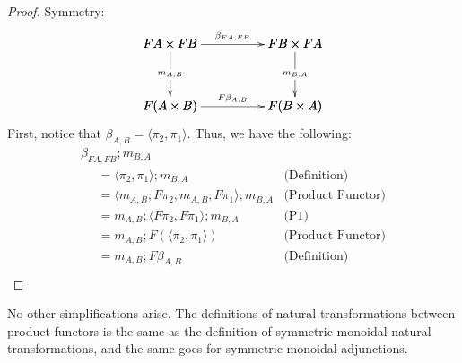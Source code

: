 \documentclass{article}
\begin{document}
\begin{proof}
\item[] Symmetry:\\
  \[
  \bfig
  \square|amma|/->`->`->`->/<1000,500>[
    FA \times FB`
    FB \times FA`
    F(A \times B)`
    F(B \times A);
    {\beta}_{FA,FB}`
    m_{A,B}`
    m_{B,A}`
    F{\beta}_{A,B}]
  \efig
  \]
  First, notice that $\beta_{A,B} = \langle \pi_2, \pi_1 \rangle$.  Thus, we have the following:
  \[
  \begin{array}{lll}
    \beta_{FA,FB};m_{B,A}\\
    \,\,\,\,\,\,\,\,=  \langle \pi_2, \pi_1 \rangle;m_{B,A} & \text{(Definition)}\\
    \,\,\,\,\,\,\,\,=  \langle m_{A,B};F\pi_2, m_{A,B};F\pi_1 \rangle;m_{B,A} & \text{(Product Functor)}\\
    \,\,\,\,\,\,\,\,=  m_{A,B};\langle F\pi_2, F\pi_1 \rangle;m_{B,A} & \text{(P1)}\\
    \,\,\,\,\,\,\,\,=  m_{A,B};F(\langle \pi_2, \pi_1 \rangle) & \text{(Product Functor)}\\
    \,\,\,\,\,\,\,\,=  m_{A,B};F\beta_{A,B} & \text{(Definition)}\\
  \end{array}
  \]
\end{proof}

No other simplifications arise.  The definitions of natural
transformations between product functors is the same as the definition
of symmetric monoidal natural transformations, and the same goes for
symmetric monoidal adjunctions.
\end{document}
